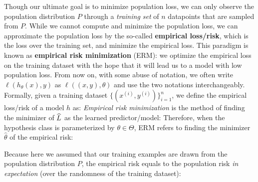 Though our ultimate goal is to minimize population loss, we can only observe the population distribution $P$ through a \emph{training set} of $n$ datapoints that are sampled from $P$.  While we cannot compute and minimize the population loss, we can approximate the population loss by the so-called \textbf{empirical loss/risk}, which is the loss over the training set, and minimize the empirical loss. This paradigm is known as \textbf{empirical risk minimization} (ERM): we optimize the empirical loss on the training dataset with the hope that it will lead us to a model with low
population loss. From now on, with some abuse of notation, we often write $\ell(h_\theta(x),y)$ as $\ell((x,y),\theta)$ and use the two notations interchangeably.  Formally, given a training dataset $\{(x^{(i)}, y^{(i)})\}_{i=1}^n$, we define the empirical loss/risk of a model $h$ as:
\emph{Empirical risk minimization} is the method of finding the minimizer of $\widehat{L}$ as the learned predictor/model:%
Therefore, when the hypothesis class is parameterized by $\theta\in \Theta$, ERM refers to finding the minimizer $\hat{\theta}$ of the empirical risk:

Because here we assumed that our training examples are drawn from the population distribution $P$, the empirical risk equals to the population risk 
\emph{in expectation} (over the randomness of the training dataset):


